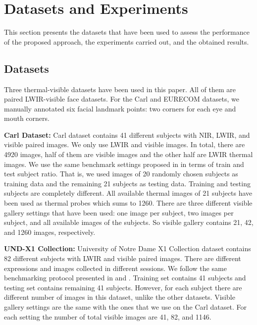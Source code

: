 \documentclass[conference]{IEEEtran}
\begin{document}
\section{Datasets and Experiments}
This section presents the datasets that have been used to assess the performance of the proposed approach, the experiments carried out, and the obtained results.
\subsection{Datasets}
Three thermal-visible datasets have been used in this paper. All of them are paired LWIR-visible face datasets. For the Carl and EURECOM datasets, we manually annotated six facial landmark points: two corners for each eye and mouth corners. 

\textbf{Carl Dataset:} Carl dataset \cite{carl2010,carl2013} contains 41 different subjects with NIR, LWIR, and visible paired images. We only use LWIR and visible images. In total, there are 4920 images, half of them are visible images and the other half are LWIR thermal images. We use the same benchmark settings proposed in \cite{deepperceptual} in terms of train and test subject ratio. That is, we used images of 20 randomly chosen subjects as training data and the remaining 21 subjects as testing data. Training and testing subjects are completely different. All available thermal images of 21 subjects have been used as thermal probes which sums to 1260. There are three different visible gallery settings that have been used: one image per subject, two images per subject, and all available images of the subjects. So visible gallery contains 21, 42, and 1260 images, respectively. 

\textbf{UND-X1 Collection:} University of Notre Dame X1 Collection dataset \cite{notredame,notredame2} contains 82 different subjects with  LWIR and visible paired images. There are different expressions and images collected in different sessions. We follow the same benchmarking protocol presented in \cite{partialleastsquares} and \cite{deepperceptual}. Training set contains 41 subjects and testing set contains remaining 41 subjects. However, for each subject there are different number of images in this dataset, unlike the other datasets. Visible gallery settings are the same with the ones that we use on the Carl dataset. For each setting the number of total visible images are 41, 82, and 1146. 
\end{document}
